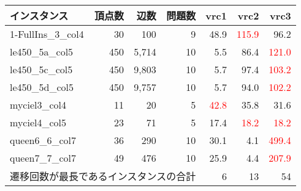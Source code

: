 \begin{tabular}{lrrr|rrr} \hline
  インスタンス & 頂点数 & 辺数 & 問題数 & vrc1 & vrc2 & vrc3 \\ \hline
  1-FullIns\_3\_col4 & 30 & 100 & 9 & 48.9 & \textcolor{red}{115.9} & 96.2 \\   
  le450\_5a\_col5 & 450 & 5,714 & 10 & 5.5 & 86.4 & \textcolor{red}{121.0} \\ 
  le450\_5c\_col5 & 450 & 9,803 & 10 & 5.7 & 97.4 & \textcolor{red}{103.2} \\ 
  le450\_5d\_col5 & 450 & 9,757 & 10 & 5.7 & 94.0 & \textcolor{red}{102.2} \\ 
  myciel3\_col4 & 11 & 20 & 5 & \textcolor{red}{42.8} & 35.8 & 31.6 \\ 
  myciel4\_col5 & 23 & 71 & 5 & 17.4 & \textcolor{red}{18.2} & \textcolor{red}{18.2} \\ 
  queen6\_6\_col7 & 36 & 290 & 10 & 30.1 & 4.1 & \textcolor{red}{499.4} \\ 
  queen7\_7\_col7 & 49 & 476 & 10 & 25.9 & 4.4 & \textcolor{red}{207.9} \\ \hline
  \multicolumn{4}{l|}{遷移回数が最長であるインスタンスの合計} & 6 & 13 & 54 \\ \hline
\end{tabular}